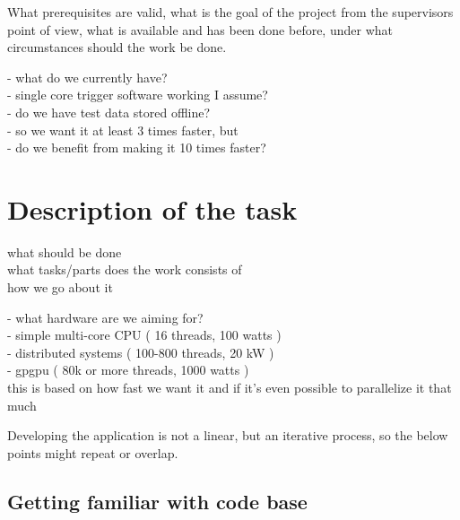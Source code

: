 \documentclass[12pt]{article}
\newcommand\tab[1][.7cm]{\hspace*{#1}}
\begin{document}
	\vspace{1pc}
	
	\color{red}
	What prerequisites are valid, what is the goal of the project from the supervisors point of view, what is available and has been done before, under what circumstances should the work be done.
	\color{black}
	
	\color{blue}
	- what do we currently have? \\
	\tab - single core trigger software working I assume? \\
	\tab - do we have test data stored offline? \\
	- so we want it at least 3 times faster, but \\
	\tab - do we benefit from making it 10 times faster? \\
	\color{black}
	
	
	
	\newpage
	\section{Description of the task}
	
	\color{red}
	what should be done \\
	what tasks/parts does the work consists of \\
	how we go about it
	\color{black}
	\vspace{1pc}
	
	
	\color{blue}
	- what hardware are we aiming for? \\
	\tab - simple multi-core CPU ( 16 threads, 100 watts ) \\
	\tab - distributed systems ( 100-800 threads, 20 kW ) \\
	\tab - gpgpu ( 80k or more threads, 1000 watts ) \\
	this is based on how fast we want it and if it's even possible to parallelize it that much
	\color{black}
	\vspace{1pc}
	
	Developing the application is not a linear, but an iterative process, so the below points might repeat or overlap.
	
	
	\subsection{Getting familiar with code base}
	
\end{document}

